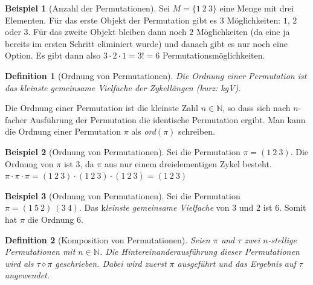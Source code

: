 \documentclass[12pt,a4paper, usenames, dvipsnames]{article}
\theoremstyle{mystyle}
\newtheorem{definition}{Definition}
\theoremstyle{definition}
\newtheorem{bsp}{Beispiel}[definition]
\begin{document}
\begin{bsp}[Anzahl der Permutationen]
Sei $M = \{ 1 \ 2 \ 3 \}$ eine Menge mit drei Elementen. Für das erste Objekt der Permutation gibt es $3$ Möglichkeiten: $1$, $2$ oder $3$. Für das zweite Objekt bleiben dann noch $2$ Möglichkeiten (da eine ja bereits im ersten Schritt eliminiert wurde) und danach gibt es nur noch eine Option. Es gibt dann also $3 \cdot 2 \cdot 1 = 3! = 6$ Permutationsmöglichkeiten.

\end{bsp}

\begin{definition}[Ordnung von Permutationen]

Die Ordnung einer Permutation ist das kleinste gemeinsame Vielfache der Zykellängen (kurz: kgV).

\end{definition}

Die Ordnung einer Permutation ist die kleinste Zahl $n \in \mathbb{N}$, so dass sich nach $n$-facher Ausführung der Permutation die identische Permutation ergibt. Man kann die Ordnung einer Permutation $\pi$ als \textit{ord}$(\pi)$ schreiben.

\begin{bsp}[Ordnung von Permutationen]

Sei die Permutation $\pi = (1 \ 2 \ 3)$. Die Ordnung von $\pi$ ist 3, da $\pi$ aus nur einem dreielementigen Zykel besteht. $\pi \cdot \pi \cdot \pi = (1 \ 2 \ 3) \cdot (1 \ 2 \ 3) \cdot (1 \ 2 \ 3) =  (1 \ 2 \ 3) $

\end{bsp}

\begin{bsp}[Ordnung von Permutationen]

Sei die Permutation $\pi = (1 \ 5 \ 2)\ (3 \ 4)$. Das k\textit{leinste gemeinsame Vielfache} von $3$ und $2$ ist 6. Somit hat $\pi$ die Ordnung 6.

\end{bsp}

\begin{definition}[Komposition von Permutationen]
Seien $\pi$ und $\tau$ zwei $n$-stellige Permutationen mit $n \in \mathbb{N}$. Die Hintereinanderausführung dieser Permutationen wird als $\tau \diamond \pi$ geschrieben. Dabei wird zuerst $\pi$ ausgeführt und das Ergebnis auf $\tau$ angewendet.
\end{definition}
\end{document}

